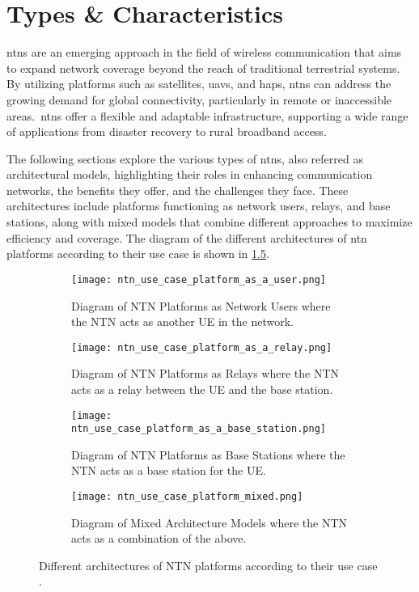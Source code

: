 \chapter{Types \& Characteristics}\label{ch:types_technologies_characteristics}

\glspl{ntn} are an emerging approach in the field of wireless communication that aims to expand network coverage beyond the reach of traditional terrestrial systems. By utilizing platforms such as satellites, \glspl{uav}, and \glspl{hap}, \glspl{ntn} can address the growing demand for global connectivity, particularly in remote or inaccessible areas.\ \glspl{ntn} offer a flexible and adaptable infrastructure, supporting a wide range of applications from disaster recovery to rural broadband access.

The following sections explore the various types of \glspl{ntn}, also referred as architectural models, highlighting their roles in enhancing communication networks, the benefits they offer, and the challenges they face. These architectures include platforms functioning as network users, relays, and base stations, along with mixed models that combine different approaches to maximize efficiency and coverage. The diagram of the different architectures of \gls{ntn} platforms according to their use case is shown in \cref{fig:ntn_platforms}.

\begin{figure}
  \begin{subfigure}{0.4\textheight}
    \texttt{[image: ntn\_use\_case\_platform\_as\_a\_user.png]}
    \caption{Diagram of NTN Platforms as Network Users where the NTN acts as another UE in the network.}\label{fig:ntn_platform_as_a_user}
  \end{subfigure}

  \begin{subfigure}{0.4\textheight}
    \texttt{[image: ntn\_use\_case\_platform\_as\_a\_relay.png]}
    \caption{Diagram of NTN Platforms as Relays where the NTN acts as a relay between the UE and the base station.}\label{fig:ntn_platform_as_a_relay}
  \end{subfigure}

  \begin{subfigure}{0.4\textheight}
    \texttt{[image: ntn\_use\_case\_platform\_as\_a\_base\_station.png]}
    \caption{Diagram of NTN Platforms as Base Stations where the NTN acts as a base station for the UE.}\label{fig:ntn_platform_as_a_base_station}
  \end{subfigure}

  \begin{subfigure}{0.4\textheight}
    \texttt{[image: ntn\_use\_case\_platform\_mixed.png]}
    \caption{Diagram of Mixed Architecture Models where the NTN acts as a combination of the above.}\label{fig:mixed_architecture_models}
  \end{subfigure}

  \caption{Different architectures of NTN platforms according to their use case \autocite{evolution_ntn_from_5g_6g_survey}.}\label{fig:ntn_platforms}
\end{figure}

